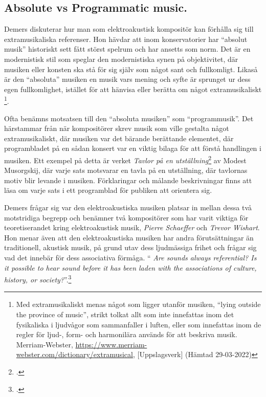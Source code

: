 \documentclass{article}
\begin{document}


\subsection{Absolute vs Programmatic music.}
Demers diskuterar hur man som elektroakustisk kompositör kan förhålla sig till extramusikaliska referenser.
Hon hävdar att inom konservatorier har ``absolut musik'' historiskt sett fått störst spelrum och har ansetts
som norm. Det är en modernistisk stil som speglar den modernistiska synen på objektivitet, där musiken eller
konsten ska stå för sig själv som något sant och fullkomligt. Likaså är den ``absoluta'' musiken en musik vars
mening och syfte är sprunget ur dess egen fullkomlighet, istället för att hänvisa eller berätta om något
extramusikaliskt \footnote{Med extramusikaliskt menas något som ligger utanför musiken, ``lying outside the
province of music'', strikt tolkat allt som inte innefattas inom det fysikaliska i ljudvågor som sammanfaller
i luften, eller som innefattas inom de regler för ljud-, form- och harmonilära används för att beskriva musik.
\\ Merriam-Webster, \url{https://www.merriam-webster.com/dictionary/extramusical}, [Uppslagsverk]
(Hämtad 29-03-2022)}\nocite{webster}.

Ofta benämns motsatsen till den ``absoluta musiken'' som ``programmusik''. Det härstammar från när
kompositörer skrev musik som ville gestalta något extramusikaliskt, där musiken var det bärande berättande
elementet, där programbladet på en sådan konsert var en viktig bilaga för att förstå handlingen i musiken.
Ett exempel på detta är verket \emph{Tavlor på en utställning}\footcite{Tavlor} av Modest Musorgskij,
där varje sats motsvarar en tavla på en utställning, där tavlornas motiv blir levande i musiken. Förklaringar
och målande beskrivningar finns att läsa om varje sats i ett programblad för publiken att orientera sig.

Demers frågar sig var den elektroakustiska musiken platsar in mellan dessa två motstridiga begrepp och
benämner två kompositörer som har varit viktiga för teoretiserandet kring elektroakustisk musik, \emph{Pierre
Schaeffer} och \emph{Trevor Wishart}. Hon menar även att den elektroakustiska musiken har andra förutsättningar än
traditionell, akustisk musik, på grund utav dess ljudmässiga frihet och frågar sig vad det innebär för dess
associativa förmåga. `` \emph{Are sounds always referential? Is it possible to hear sound before it has been
laden with the associations of culture, history, or society?}''.\footcite[23]{JoannaDemers}
\end{document}

